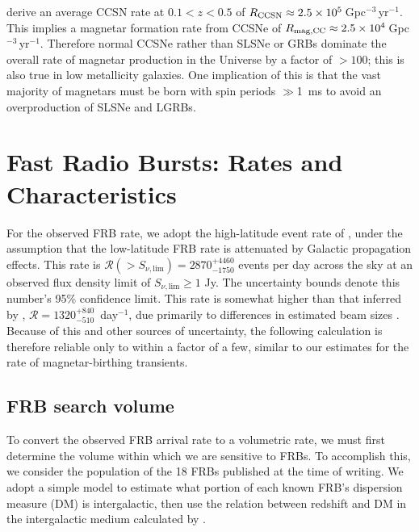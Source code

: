 \documentclass[twocolumn]{aastex6}
\newcommand{\pergpcperyr}{Gpc$^{-3}$\,yr$^{-1}$}
\begin{document}
\citet{dah2004} derive an average CCSN rate at $0.1<z<0.5$ of $R_{\rm CCSN}\approx 2.5\times10^{5}$\,\pergpcperyr.  This implies a magnetar formation rate from CCSNe of $R_{\rm mag,CC}\approx 2.5\times 10^{4}$\,\pergpcperyr.  Therefore normal CCSNe rather than SLSNe or GRBs dominate the overall rate of magnetar production in the Universe by a factor of $>100$; this is also true in low metallicity galaxies.  One implication of this is that the vast majority of magnetars must be born with spin periods $\gg$1~ms to avoid an overproduction of SLSNe and LGRBs.


\section{Fast Radio Bursts: Rates and Characteristics}
\label{s:frbs}

For the observed FRB rate, we adopt the high-latitude event rate of \citet{vbl+.2016}, under the assumption that the low-latitude FRB rate is attenuated by Galactic propagation effects. This rate is $\mathcal{R}({>}S_{\nu,\text{lim}}) = 2870^{+4460}_{-1750}$ events per day across the sky at an observed flux density limit of $S_{\nu,\text{lim}}\ge 1$ Jy. The uncertainty bounds denote this number's 95\% confidence limit. This rate is somewhat higher than that inferred by \citet{lvl+.2016}, $\mathcal{R}=1320^{+840}_{-510}$~day$^{-1}$, due primarily to differences in estimated beam sizes \citep{vbl+.2016}. Because of this and other sources of uncertainty, the following calculation is therefore reliable only to within a factor of a few, similar to our estimates for the rate of magnetar-birthing transients.

\subsection{FRB search volume}
\label{s:frbsearchvol}

To convert the observed FRB arrival rate to a volumetric rate, we must first determine the volume within which we are sensitive to FRBs. To accomplish this, we consider the population of the 18 FRBs published at the time of writing. We adopt a simple model to estimate what portion of each known FRB's dispersion measure (DM) is intergalactic, then use the relation between redshift and DM in the intergalactic medium calculated by \citet{iok2003}.
\end{document}
